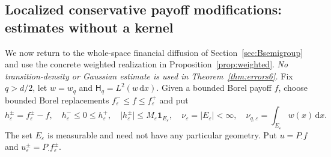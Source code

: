 \documentclass[11pt,a4paper]{article}
\theoremstyle{definition}\newtheorem{definition}{Definition}[section]\newtheorem{example}[theorem]{Example}
\theoremstyle{remark}\newtheorem{remark}[theorem]{Remark}\newtheorem{remarkSix}{Remark}[section]
\newcommand{\dd}{\,\mathrm d}
\newcommand{\abs}[1]{\lvert #1\rvert}
\newcommand{\HH}{\mathsf H_q}
\begin{document}
\subsection{Localized conservative payoff modifications: estimates without a kernel}
\label{subsec:modifications6}
We now return to the whole-space financial diffusion of Section~\ref{sec:Bsemigroup} and use the concrete weighted realization in Proposition~\ref{prop:weighted}. \emph{No transition-density or Gaussian estimate is used in Theorem~\ref{thm:errors6}.} Fix $q>d/2$, let $w=w_q$ and $\HH=L^2(w\dd x)$. Given a bounded Borel payoff $f$, choose bounded Borel replacements $f_\varepsilon^-\le f\le f_\varepsilon^+$ and put
\begin{equation}\label{eq:mods6}
 h_\varepsilon^\pm=f_\varepsilon^\pm-f,
 \quad h_\varepsilon^-\le0\le h_\varepsilon^+,
 \quad \abs{h_\varepsilon^\pm}\le M_\varepsilon\mathbf1_{E_\varepsilon},
 \quad \nu_\varepsilon=|E_\varepsilon|<\infty,
 \quad\nu_{q,\varepsilon}=\int_{E_\varepsilon}w(x)\dd x.
\end{equation}
The set $E_\varepsilon$ is measurable and need not have any particular geometry. Put $u=P_\cdot f$ and $u_\varepsilon^\pm=P_\cdot f_\varepsilon^\pm$.
\end{document}
